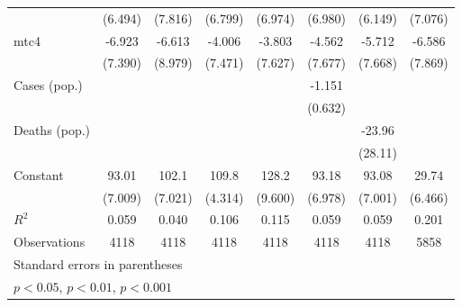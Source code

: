 \documentclass{article}
\begin{document}
{\begin{longtable}{l*{7}{c}}
                &  (6.494)         &  (7.816)         &  (6.799)         &  (6.974)         &  (6.980)         &  (6.149)         &  (7.076)         \\
mtc4            &   -6.923         &   -6.613         &   -4.006         &   -3.803         &   -4.562         &   -5.712         &   -6.586         \\
                &  (7.390)         &  (8.979)         &  (7.471)         &  (7.627)         &  (7.677)         &  (7.668)         &  (7.869)         \\
Cases (pop.)    &                  &                  &                  &                  &   -1.151         &                  &                  \\
                &                  &                  &                  &                  &  (0.632)         &                  &                  \\
Deaths (pop.)   &                  &                  &                  &                  &                  &   -23.96         &                  \\
                &                  &                  &                  &                  &                  &  (28.11)         &                  \\
Constant        &    93.01\sym{***}&    102.1\sym{***}&    109.8\sym{***}&    128.2\sym{***}&    93.18\sym{***}&    93.08\sym{***}&    29.74\sym{***}\\
                &  (7.009)         &  (7.021)         &  (4.314)         &  (9.600)         &  (6.978)         &  (7.001)         &  (6.466)         \\
\hline
\(R^{2}\)       &    0.059         &    0.040         &    0.106         &    0.115         &    0.059         &    0.059         &    0.201         \\
Observations    &     4118         &     4118         &     4118         &     4118         &     4118         &     4118         &     5858         \\
\hline\hline
\multicolumn{8}{l}{\footnotesize Standard errors in parentheses}\\
\multicolumn{8}{l}{\footnotesize \sym{*} \(p<0.05\), \sym{**} \(p<0.01\), \sym{***} \(p<0.001\)}\\
\end{longtable}
}
\end{document}
